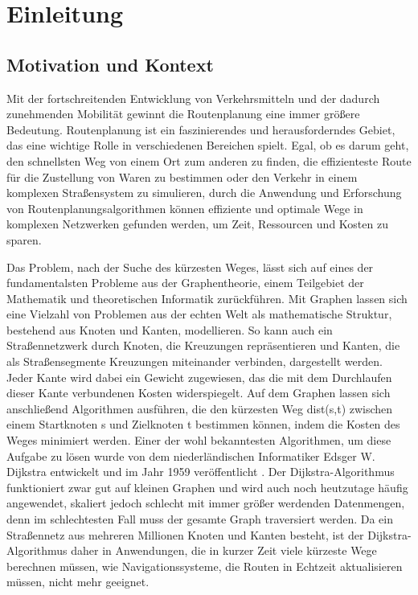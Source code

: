 \section{Einleitung}

\subsection{Motivation und Kontext}
Mit der fortschreitenden Entwicklung von Verkehrsmitteln und der dadurch zunehmenden Mobilität
gewinnt die Routenplanung eine immer größere Bedeutung. Routenplanung ist ein faszinierendes und
herausforderndes Gebiet, das eine wichtige Rolle in verschiedenen Bereichen spielt. Egal, ob es
darum geht, den schnellsten Weg von einem Ort zum anderen zu finden, die effizienteste Route für die
Zustellung von Waren zu bestimmen oder den Verkehr in einem komplexen Straßensystem zu simulieren,
durch die Anwendung und Erforschung von Routenplanungsalgorithmen können effiziente und optimale
Wege in komplexen Netzwerken gefunden werden, um Zeit, Ressourcen und Kosten zu sparen.

Das Problem, nach der Suche des kürzesten Weges, lässt sich auf eines der fundamentalsten Probleme
aus der Graphentheorie, einem Teilgebiet der Mathematik und theoretischen Informatik %
zurückführen. Mit Graphen lassen sich eine Vielzahl von Problemen aus der echten Welt als
mathematische Struktur, bestehend aus Knoten und Kanten, modellieren. So kann auch ein
Straßennetzwerk durch Knoten, die Kreuzungen repräsentieren und Kanten, die als Straßensegmente
Kreuzungen miteinander verbinden, dargestellt werden. Jeder Kante wird dabei ein Gewicht zugewiesen,
das die mit dem Durchlaufen dieser Kante verbundenen Kosten widerspiegelt. Auf dem Graphen lassen
sich anschließend Algorithmen ausführen, die den kürzesten Weg dist(s,t) zwischen einem Startknoten
s und Zielknoten t bestimmen können, indem die Kosten des Weges minimiert werden. Einer der wohl
bekanntesten Algorithmen, um diese Aufgabe zu lösen wurde von dem niederländischen Informatiker
Edsger W. Dijkstra entwickelt und im Jahr 1959 veröffentlicht \cite{Dijkstra_1959}. Der
Dijkstra-Algorithmus funktioniert zwar gut auf kleinen Graphen und wird auch noch heutzutage häufig
angewendet, skaliert jedoch schlecht mit immer größer werdenden Datenmengen, denn im schlechtesten
Fall muss der gesamte Graph traversiert werden. Da ein Straßennetz aus mehreren Millionen Knoten und
Kanten besteht, ist der Dijkstra-Algorithmus daher in Anwendungen, die in kurzer Zeit viele kürzeste
Wege berechnen müssen, wie \zB Navigationssysteme, die Routen in Echtzeit aktualisieren müssen,
nicht mehr geeignet.

